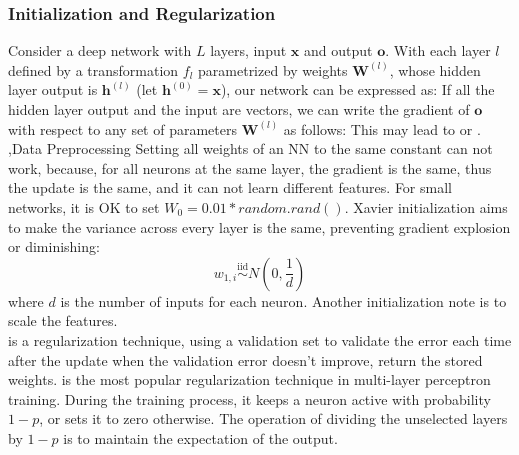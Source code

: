 \documentclass[10pt]{report}
\begin{document}
\subsubsection{Initialization and Regularization}
Consider a deep network with $L$ layers, input $\mathbf{x}$ and output $\mathbf{o}$. With each layer $l$ defined by a transformation $f_l$ parametrized by weights $\mathbf{W}^{(l)}$, whose hidden layer output is $\mathbf{h}^{(l)}$ (let $\mathbf{h}^{(0)} = \mathbf{x}$), our network can be expressed as:
If all the hidden layer output and the input are vectors, we can write the gradient of $\mathbf{o}$ with respect to any set of parameters $\mathbf{W}^{(l)}$ as follows:
This may lead to  or . 
\sep{Data Preprocessing}
Setting all weights of an NN to the same constant can not work, because, for all neurons at the same layer, the gradient is the same, thus the update is the same, and it can not 
learn different features. For small networks, it is OK to set $W_0=0.01*random.rand()$. Xavier initialization aims to make the variance across every layer is the same, 
preventing gradient explosion or diminishing:
\[w_{1,i}\overset{\mathrm{iid}}{\operatorname*{\sim}}N\left(0,\frac1d\right)\]
where $d$ is the number of inputs for each neuron. Another initialization note is to scale the features.\\
 is a regularization technique, using a validation set to validate the error each time after the update when the validation error doesn't improve, return the stored weights. 
 is the most popular regularization technique in multi-layer perceptron training. During the training process, it keeps a neuron active with probability $1-p$, or sets it to zero otherwise. 
The operation of dividing the unselected layers by $1-p$ is to maintain the expectation of the output.
\end{document}
